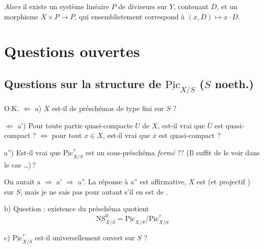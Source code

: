 \documentclass[11pt,a4paper]{article}
\begin{document}

\emph{Alors} il existe un système linéaire $P$ de diviseurs sur $Y$, contenant $D$, et un morphisme $X \times P \to P$, qui ensemblistement correspond à $(x, D) \mapsto x \cdot D$.

\section{Questions ouvertes}

\subsection{Questions sur la structure de $\underline{\mathrm{Pic}}_{X/S}$ ($S$ noeth.)}

O.K. $\Leftarrow$ a) $X$ est-il   de préschémas de type fini sur $S$ ? 

$\Leftarrow$ a') Pour toute partie quasi-compacte $U$ de $X$, est-il vrai que $\overline{U}$ est quasi-compact ? $\Longleftrightarrow$ pour tout $x \in X$, est-il vrai que $\overline{x}$ est quasi-compact ?

a'') Est-il vrai que \struck{\ill{}} $\underline{\mathrm{Pic}}^{\tau}_{X/S}$ est un sous-préschéma \emph{fermé} ?? (Il suffit de le voir dans le cas …)\,?

On aurait a $\Rightarrow$ a' $\Rightarrow$ a''. La réponse à a'' est affirmative,  $X$ est \struck{\ill{}}  (et projectif ) sur $S$, mais je ne sais pas pour autant s'il en est de \ill{} \ill{}.

b) Question : existence du préschéma quotient
\[ \underline{\mathrm{NS}}^{0}_{X/S} = \underline{\mathrm{Pic}}_{X/S} / \underline{\mathrm{Pic}}^{\tau}_{X/S} \]

c) $\underline{\mathrm{Pic}}^{\tau}_{X/S}$ est-il universellement ouvert sur $S$ ? 
\end{document}
